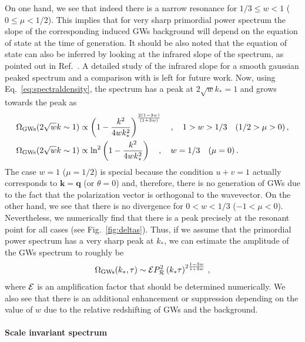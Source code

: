 \documentclass[aps,10pt,prd,groupedaddress,nofootinbib,notitlepage,eqsecnum,preprintnumbers]{revtex4-1}
\begin{document}
On one hand, we see that indeed there is a narrow resonance for $1/3\leq w<1$ ($0\leq\mu<1/2$). This implies that for very sharp primordial power spectrum the slope of the corresponding induced GWs background will depend on the equation of state at the time of generation. It should be also noted that the equation of state can also be inferred by looking at the infrared slope of the spectrum, as pointed out in Ref.~\cite{Cai:2019cdl}. A detailed study of the infrared slope for a smooth gaussian peaked spectrum and a comparison with \cite{Cai:2019cdl} is left for future work. Now, using Eq.~\eqref{eq:spectraldensity}, the spectrum has a peak at $2\sqrt{w}k_*=1$ and grows towards the peak as
\begin{align}
\Omega_{\rm GWs}(2\sqrt{w}k\sim1)&\propto\left(1-\frac{k^2}{4wk_*^2}\right)^{\frac{2(1-3w)}{(1+3w)}}\quad,\quad 1>w>1/3\quad (1/2>\mu>0)\,,\\
\Omega_{\rm GWs}(2\sqrt{w}k\sim1)&\propto\ln^2\left(1-\frac{k^2}{4wk_*^2}\right)\quad,\quad w=1/3 \quad (\mu=0)\,.
\end{align}
The case $w=1$ ($\mu=1/2$) is special because the condition $u+v=1$ actually corresponds to $\mathbf{k}=\mathbf{q}$ (or $\theta=0$) and, therefore, there is no generation of GWs due to the fact that the polarization vector is orthogonal to the wavevector. On the other hand, we see that there is no divergence for $0<w<1/3$ ($-1<\mu<0$). Nevertheless, we numerically find that there is a peak precisely at the resonant point for all cases (see Fig.~\ref{fig:deltas}). Thus, if we assume that the primordial power spectrum has a very sharp peak at $k_*$, we can estimate the amplitude of the GWs spectrum to roughly be
\begin{align}
\Omega_{\rm GWs}(k_*,\tau)\sim {\cal E} P_{\cal R}^2\left(k_*\tau\right)^{2\frac{1-3w}{1+3w}}\,,
\end{align}
where ${\cal E}$ is an amplification factor that should be determined numerically. We also see that there is an additional enhancement or suppression depending on the value of $w$ due to the relative redshifting of GWs and the background.

\paragraph[(i)]{Scale invariant spectrum}
\end{document}
